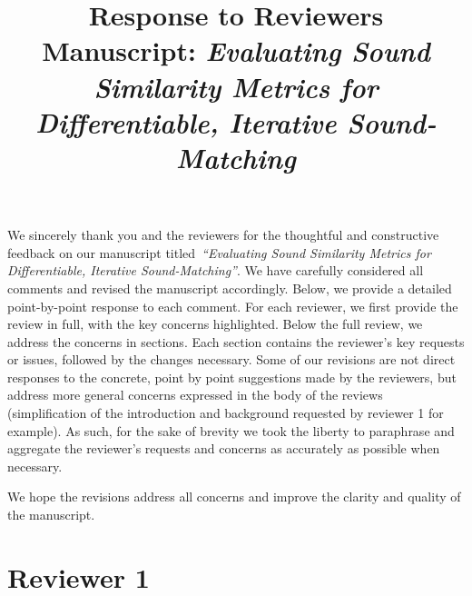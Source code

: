 \documentclass[11pt]{article}
\title{\vspace{-0.5em}Response to Reviewers\\
\large Manuscript: \emph{Evaluating Sound Similarity Metrics for Differentiable, Iterative Sound-Matching}}
\author{}
\date{}
\begin{document}
\maketitle
\vspace{-1.25em}

\noindent
We sincerely thank you and the reviewers for the thoughtful and constructive feedback on our manuscript titled~\emph{``Evaluating Sound Similarity Metrics for Differentiable, Iterative Sound-Matching''}. We have carefully considered all comments and revised the manuscript accordingly. Below, we provide a detailed point-by-point response to each comment. 
For each reviewer, we first provide the review in full, with the key concerns highlighted. Below the full review, we address the concerns in sections. Each section contains the reviewer's key requests or issues, followed by the changes necessary. Some of our revisions are not direct responses to the concrete, point by point suggestions made by the reviewers, but address more general concerns expressed in the body of the reviews (simplification of the introduction and background requested by reviewer 1 for example). As such, for the sake of brevity we took the liberty to paraphrase and aggregate the reviewer's requests and concerns as accurately as possible when necessary. 

\medskip
\noindent
We hope the revisions address all concerns and improve the clarity and quality of the manuscript.

\section*{Reviewer 1}
\end{document}
